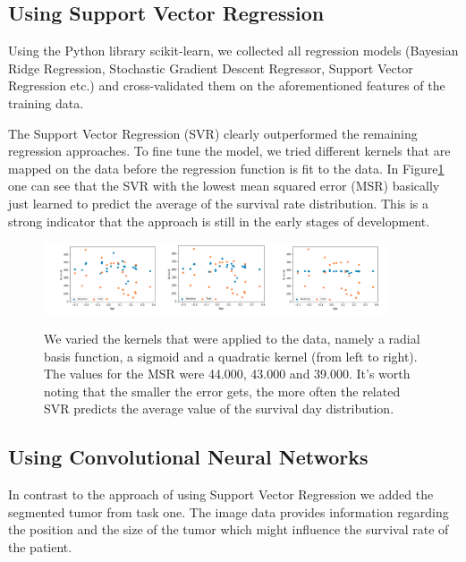 \documentclass[a4paper,12pt,pagesize,headsepline,bibtotoc,titlepage]{scrartcl}
\begin{document}
\subsection{Using Support Vector Regression}


Using the Python library scikit-learn\cite{scikit-learn}, we collected all regression models (Bayesian Ridge Regression, Stochastic Gradient Descent Regressor, Support Vector Regression etc.) and cross-validated them on the aforementioned features of the training data.

The Support Vector Regression (SVR) clearly outperformed the remaining regression approaches.
To fine tune the model, we tried different kernels that are mapped on the data before the regression function is fit to the data.
In Figure\ref{fig:svr_kernels} one can see that the SVR with the lowest mean squared error (MSR) basically just learned to predict the average of the survival rate distribution.
This is a strong indicator that the approach is still in the early stages of development.


\begin{figure}[!t]
\begin{center}
\includegraphics*[width=0.9\textwidth]{images/svr_kernels.png}\\
\caption{We varied the kernels that were applied to the data, namely a radial basis function, a sigmoid and a quadratic kernel (from left to right). The values for the MSR were 44.000, 43.000 and 39.000. It's worth noting that the smaller the error gets, the more often the related SVR predicts the average value of the survival day distribution.}
\label{fig:svr_kernels}
\end{center}
\end{figure}

\subsection{Using Convolutional Neural Networks}

In contrast to the approach of using Support Vector Regression we added the segmented tumor from task one. The image data provides information regarding the position and the size of the tumor which might influence the survival rate of the patient. \\
\end{document}
